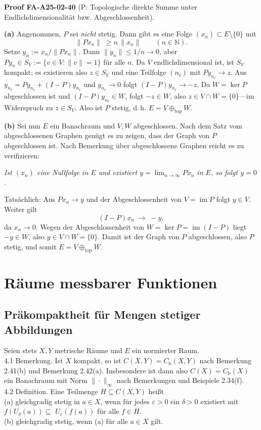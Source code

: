 \documentclass[10pt, letterpaper]{article}
\newcommand{\CustomHeading}[3]{%
  \par\medskip\noindent%
  \textbf{#1 #2} \textnormal{(#3)}.\enskip%
}
\newenvironment{PROOF}[2]{\begin{unitbox}\CustomHeading{Proof}{#1}{#2}}{\end{unitbox}}
\begin{document}
\begin{PROOF}{FA-A25-02-40}{P: Topologische direkte Summe unter Endlichdimensionalität bzw. Abgeschlossenheit}
\textbf{(a)} Angenommen, $P$ sei \emph{nicht} stetig. Dann gibt es eine Folge $(x_n)\subset E\setminus\{0\}$ mit
\[
\|Px_n\|\;\ge n\,\|x_n\|\qquad(n\in\mathbb{N}).
\]
Setze $y_n:=x_n/\|Px_n\|$. Dann $\|y_n\|\le 1/n\to 0$, aber $Py_n\in S_V:=\{v\in V:\|v\|=1\}$ für alle $n$.
Da $V$ endlichdimensional ist, ist $S_V$ kompakt; es existieren also $z\in S_V$ und eine Teilfolge $(n_\ell)$ mit $Py_{n_\ell}\to z$.
Aus $y_{n_\ell}=Py_{n_\ell}+(I-P)y_{n_\ell}$ und $y_{n_\ell}\to 0$ folgt $(I-P)y_{n_\ell}\to -z$.
Da $W=\ker P$ abgeschlossen ist und $(I-P)y_{n_\ell}\in W$, folgt $-z\in W$, also $z\in V\cap W=\{0\}$—im Widerspruch zu $z\in S_V$.
Also ist $P$ stetig, d.\,h. $E=V\oplus_{\mathrm{top}} W$.

\medskip
\textbf{(b)} Sei nun $E$ ein Banachraum und $V,W$ abgeschlossen. Nach dem Satz vom abgeschlossenen Graphen genügt es zu zeigen, dass der Graph von $P$ abgeschlossen ist.
Nach Bemerkung über abgeschlossene Graphen reicht es zu verifizieren:

\emph{Ist $(x_n)$ eine Nullfolge in $E$ und existiert $y=\lim_{n\to\infty}Px_n$ in $E$, so folgt $y=0$.}

Tatsächlich: Aus $Px_n\to y$ und der Abgeschlossenheit von $V=\operatorname{im}P$ folgt $y\in V$. Weiter gilt
\[
(I-P)x_n\;\longrightarrow\; -y,
\]
da $x_n\to 0$. Wegen der Abgeschlossenheit von $W=\ker P=\operatorname{im}(I-P)$ liegt $-y\in W$, also $y\in V\cap W=\{0\}$.
Damit ist der Graph von $P$ abgeschlossen, also $P$ stetig, und somit $E=V\oplus_{\mathrm{top}} W$.
\end{PROOF}


\pagebreak

\section{Räume messbarer Funktionen}


\subsection{Präkompaktheit für Mengen stetiger Abbildungen}

Seien stets $X, Y$ metrische Räume und $E$ ein normierter Raum.\\
4.1 Bemerkung. Ist $X$ kompakt, so ist $C(X, Y)=C_{\mathrm{b}}(X, Y)$ nach Bemerkung 2.41(b) und Bemerkung 2.42(a). Insbesondere ist dann also $C(X)=C_{\mathrm{b}}(X)$ ein Banachraum mit Norm $\|\cdot\|_{\infty}$ nach Bemerkungen und Beispiele 2.34(f).\\
4.2 Definition. Eine Teilmenge $H \subseteq C(X, Y)$ heißt\\
(a) gleichgradig stetig in $a \in X$, wenn für jedes $\varepsilon>0$ ein $\delta>0$ existiert mit $f\left(U_{\delta}(a)\right) \subseteq$ $U_{\varepsilon}(f(a))$ für alle $f \in H$.\\
(b) gleichgradig stetig, wenn (a) für alle $a \in X$ gilt.
\end{document}
